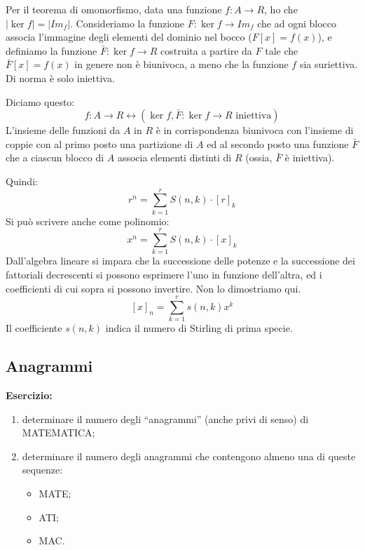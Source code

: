 Per il teorema di omomorfismo, data una funzione $f : A \to R$, ho che $|\ker f| = |Im_f|$. Consideriamo la funzione $F : \ker f \to Im_f$ che ad ogni blocco associa l'immagine degli elementi del dominio nel bocco ($F[x] = f(x)$), e definiamo la funzione $\bar F : \ker f \to R$ costruita a partire da $F$ tale che $\bar F [x] = f(x)$ in genere non \`e biunivoca, a meno che la funzione $f$ sia suriettiva. Di norma \`e solo iniettiva.

Diciamo questo:
\begin{equation}
f : A \to R \leftrightarrow ( \ker f , \bar F : \ker f \to R \text{ iniettiva})
\end{equation}
L'insieme delle funzioni da $A$ in $R$ \`e in corrispondenza biunivoca con l'insieme di coppie con al primo posto una partizione di $A$ ed al secondo posto una funzione $\bar F$ che a ciascun blocco di $A$ associa elementi distinti di $R$ (ossia, $\bar F$ \`e iniettiva).

Quindi:
\[
r^n = \sum_{k = 1}^{r} S(n, k) \cdot [r]_k
\]
Si pu\`o scrivere anche come polinomio:
\[
x^n = \sum_{k = 1}^{r} S(n, k) \cdot [x]_k
\]
Dall'algebra lineare si impara che la successione delle potenze e la successione dei fattoriali decrescenti si possono esprimere l'uno in funzione dell'altra, ed i coefficienti di cui sopra si possono invertire. Non lo dimostriamo qui.
\[
[x]_n = \sum_{k = 1}^{r} s(n, k) x^k
\]
Il coefficiente $s(n, k)$ indica il numero di Stirling di prima specie.

\subsection{Anagrammi}

\textbf{Esercizio:} 
\begin{enumerate}
  \item determinare il numero degli ``anagrammi'' (anche privi di senso) di MATEMATICA;
  \item determinare il numero degli anagrammi che contengono almeno una di queste sequenze:
  \begin{itemize}
    \item MATE;
    \item ATI;
    \item MAC.
  \end{itemize}
\end{enumerate}

